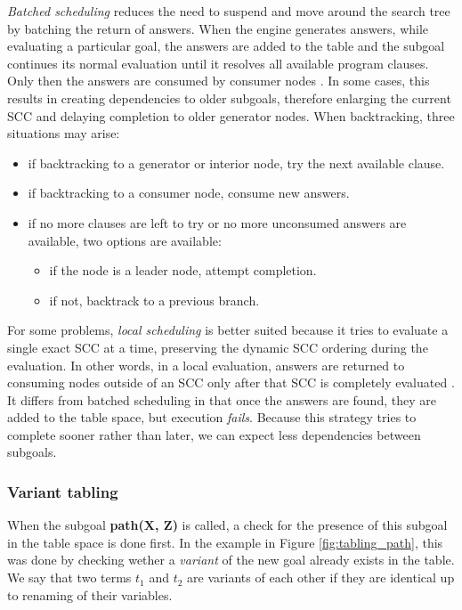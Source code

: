 \textit{Batched scheduling} reduces the need to suspend and move around the search tree by batching the return of answers.
When the engine generates answers, while evaluating a particular goal, the answers are added to the table and the subgoal continues its normal
evaluation until it resolves all available program clauses. Only then the answers are consumed by consumer nodes \cite{Freire-96}.
In some cases, this results in creating dependencies to older subgoals, therefore enlarging the current SCC and delaying completion
to older generator nodes. When backtracking, three situations may arise:

\begin{itemize}
  \item if backtracking to a generator or interior node, try the next available clause.
  \item if backtracking to a consumer node, consume new answers.
  \item if no more clauses are left to try or no more unconsumed answers are available, two options are available:
    \begin{itemize}
      \item if the node is a leader node, attempt completion.
      \item if not, backtrack to a previous branch.
    \end{itemize}
\end{itemize}

For some problems, \textit{local scheduling} is better suited because it tries to evaluate a single exact SCC at a time, preserving the dynamic
SCC ordering during the evaluation. In other words, in a local evaluation, answers are returned to consuming nodes outside of an SCC only after that
SCC is completely evaluated \cite{Freire-96}.
It differs from batched scheduling in that once the answers are found, they are added to the table space, but execution
\textit{fails}. Because this strategy tries to complete sooner rather than later, we can expect less dependencies between subgoals.

\subsubsection{Variant tabling} \label{sec:variant_tabling}

When the subgoal \textbf{path(X, Z)} is called, a check for the presence of this subgoal in the table space is done first.
In the example in Figure \ref{fig:tabling_path}, this was done by checking wether a \textit{variant} of the new goal already
exists in the table. We say that two terms $t_1$ and $t_2$ are variants of each other if they are identical up to renaming of their
variables.

